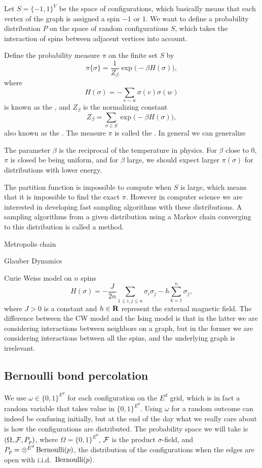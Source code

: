 Let $S = \{-1,1\}^{V}$ be the space of configurations, which basically means that each vertex of the graph is assigned a spin $-1$ or $1$. We want to define a probability distribution $P$ on the space of random configurations $S$, which takes the interaction of spins between adjacent vertices into account. 

Define the probability measure $\pi$ on the finite set $S$ by 
\[
    \pi\{\sigma\} = \frac{1}{Z_\beta} \exp\bigl(-\beta H(\sigma)\bigr),
\]
where \[
    H(\sigma) = -\sum_{v\sim w} \sigma(v)\sigma(w)
\] is known as the , and $Z_\beta$ is the normalizing constant \[
    Z_\beta = \sum_{\sigma \in S} \exp\bigl(-\beta H(\sigma)\bigr),
\] also known as the . The measure $\pi$ is called the . In general we can generalize 

The parameter $\beta$ is the reciprocal of the temperature in physics. For $\beta$ close to $0$, $\pi$ is closed be being uniform, and for $\beta$ large, we should expect larger $\pi(\sigma)$ for distributions with lower energy.

The partition function is impossible to compute when $S$ is large, which means that it is impossible to find the exact $\pi$. However in computer science we are interested in developing fast sampling algorithms with these distributions. A sampling algorithms from a given distribution using a Markov chain converging to this distribution is called a  method.

Metropolis chain

Glauber Dynamics

Curie Weiss model on $n$ spins \[
    H(\sigma) = -\frac{J}{2n}\sum_{1\leq i,j\leq n} \sigma_i\sigma_j - h\sum_{k=1}^n \sigma_j,
\] where $J > 0$ is a constant and $h \in \mathbf{R}$ represent the external magnetic field. The difference between the CW model and the Ising model is that in the latter we are considering interactions between neighbors on a graph, but in the former we are considering interactions between all the spins, and the underlying graph is irrelevant.

\subsection{Bernoulli bond percolation} \label{subsec:bbp}
We use $\omega \in \{0,1\}^{E^d}$ for each configuration on the $E^d$ grid, which is in fact a random variable that takes value in $\{0,1\}^{E^d}$. Using $\omega$ for a random outcome can indeed be confusing initially, but at the end of the day what we really care about is how the configurations are distributed. The probability space we will take is $(\Omega,\mathcal{F},P_p)$, where $\Omega = \{0,1\}^{E^d}$, $\mathcal{F}$ is the product $\sigma$-field, and $P_p = \otimes^{E^d} \operatorname{Bernoulli}(p)$, the distribution of the configurations when the edges are open with i.i.d.\ $\operatorname{Bernoulli}(p)$.

